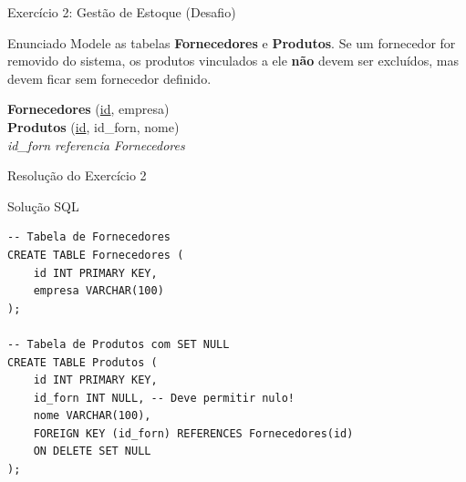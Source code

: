 \documentclass[9pt]{beamer}
\begin{document}
\begin{frame}{Exercício 2: Gestão de Estoque (Desafio)}
  \begin{block}{Enunciado}
    Modele as tabelas \textbf{Fornecedores} e \textbf{Produtos}. Se um fornecedor for removido do sistema, os produtos vinculados a ele \textbf{não} devem ser excluídos, mas devem ficar sem fornecedor definido.
  \end{block}
  \vspace{0.4cm}
  \centering

  \vspace{0.3cm}
  \centering
  \small
  \textbf{Fornecedores} (\underline{id}, empresa) \\
  \textbf{Produtos} (\underline{id}, id\_forn, nome) \\
  \textit{id\_forn referencia Fornecedores}
\end{frame}

\begin{frame}[fragile]{Resolução do Exercício 2}
  \begin{exampleblock}{Solução SQL}
\begin{lstlisting}
-- Tabela de Fornecedores
CREATE TABLE Fornecedores (
    id INT PRIMARY KEY,
    empresa VARCHAR(100)
);

-- Tabela de Produtos com SET NULL
CREATE TABLE Produtos (
    id INT PRIMARY KEY,
    id_forn INT NULL, -- Deve permitir nulo!
    nome VARCHAR(100),
    FOREIGN KEY (id_forn) REFERENCES Fornecedores(id)
    ON DELETE SET NULL
);
\end{lstlisting}
  \end{exampleblock}
\end{frame}
\end{document}
